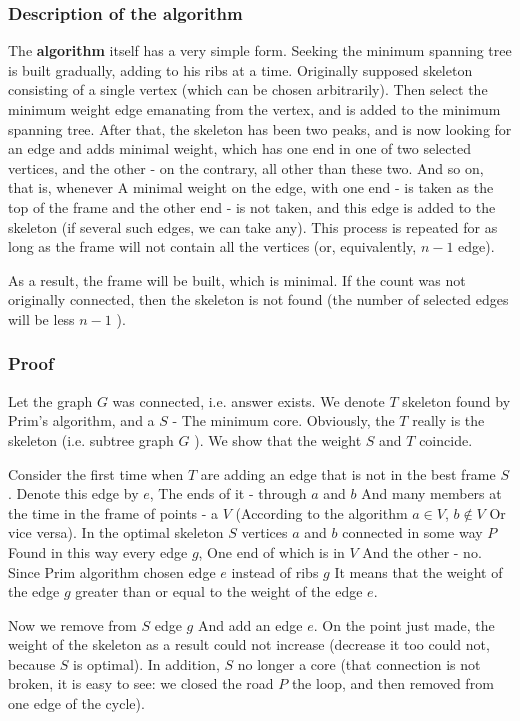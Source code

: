 \subsubsection{ Description of the algorithm }

The \textbf{algorithm} itself has a very simple form. Seeking the minimum spanning tree is built gradually, adding to his ribs at a time. Originally supposed skeleton consisting of a single vertex (which can be chosen arbitrarily). Then select the minimum weight edge emanating from the vertex, and is added to the minimum spanning tree. After that, the skeleton has been two peaks, and is now looking for an edge and adds minimal weight, which has one end in one of two selected vertices, and the other - on the contrary, all other than these two. And so on, that is, whenever A minimal weight on the edge, with one end - is taken as the top of the frame and the other end - is not taken, and this edge is added to the skeleton (if several such edges, we can take any). This process is repeated for as long as the frame will not contain all the vertices (or, equivalently, $n-1$ edge).

As a result, the frame will be built, which is minimal. If the count was not originally connected, then the skeleton is not found (the number of selected edges will be less $n-1$ ).

\subsubsection{ Proof }

Let the graph $G$ was connected, i.e. answer exists. We denote $T$ skeleton found by Prim's algorithm, and a $S$ - The minimum core. Obviously, the $T$ really is the skeleton (i.e. subtree graph $G$ ). We show that the weight $S$ and $T$ coincide.

Consider the first time when $T$ are adding an edge that is not in the best frame $S$. Denote this edge by $e$, The ends of it - through $a$ and $b$ And many members at the time in the frame of points - a $V$ (According to the algorithm $a \in V$, $b \not \in V$ Or vice versa). In the optimal skeleton $S$ vertices $a$ and $b$ connected in some way $P$ Found in this way every edge $g$, One end of which is in $V$ And the other - no. Since Prim algorithm chosen edge $e$ instead of ribs $g$ It means that the weight of the edge $g$ greater than or equal to the weight of the edge $e$.

Now we remove from $S$ edge $g$ And add an edge $e$. On the point just made, the weight of the skeleton as a result could not increase (decrease it too could not, because $S$ is optimal). In addition, $S$ no longer a core (that connection is not broken, it is easy to see: we closed the road $P$ the loop, and then removed from one edge of the cycle).

